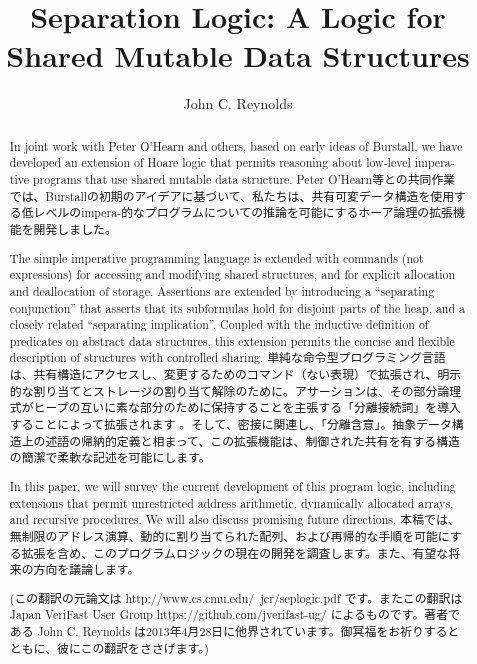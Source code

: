 \documentclass[submit,techreq,noauthor,onecolumn]{ipsj}
\begin{document}
\title{Separation Logic: A Logic for Shared Mutable Data Structures}

\author{John C. Reynolds}{}{}

\begin{abstract}

  In joint work with Peter O’Hearn and others, based on early ideas of Burstall,
  we have developed an extension of Hoare logic that permits reasoning about low-level impera-tive programs that use shared mutable data structure.
Peter O’Hearn等との共同作業では、Burstallの初期のアイデアに基づいて、私たちは、共有可変データ構造を使用する低レベルのimpera-的なプログラムについての推論を可能にするホーア論理の拡張機能を開発しました。

  The simple imperative programming language is extended with commands (not expressions) for accessing and modifying shared structures,
  and for explicit allocation and deallocation of storage.
  Assertions are extended by introducing a “separating conjunction” that asserts that its subformulas hold for disjoint parts of the heap,
  and a closely related “separating implication”.
  Coupled with the inductive definition of predicates on abstract data structures,
  this extension permits the concise and flexible description of structures with controlled sharing.
  単純な命令型プログラミング言語は、共有構造にアクセスし、変更するためのコマンド（ない表現）で拡張され、明示的な割り当てとストレージの割り当て解除のために。アサーションは、その部分論理式がヒープの互いに素な部分のために保持することを主張する「分離接続詞」を導入することによって拡張されます
。そして、密接に関連し、「分離含意」。抽象データ構造上の述語の帰納的定義と相まって、この拡張機能は、制御された共有を有する構造の簡潔で柔軟な記述を可能にします。

  In this paper, we will survey the current development of this program logic, including extensions that permit unrestricted address arithmetic, dynamically allocated arrays, and recursive procedures. We will also discuss promising future directions.
  本稿では、無制限のアドレス演算、動的に割り当てられた配列、および再帰的な手順を可能にする拡張を含め、このプログラムロジックの現在の開発を調査します。また、有望な将来の方向を議論します。

\vspace{2mm}

(この翻訳の元論文は http://www.cs.cmu.edu/~jcr/seplogic.pdf です。またこの翻訳は Japan VeriFast User Group https://github.com/jverifast-ug/ によるものです。著者である John C. Reynolds は2013年4月28日に他界されています。御冥福をお祈りするとともに、彼にこの翻訳をささげます。)
\end{abstract}
\end{document}
